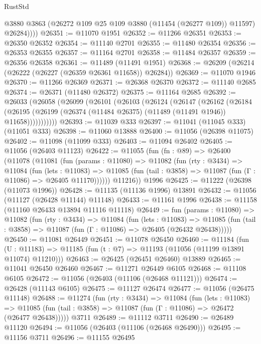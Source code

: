 \begin{lexlean}{RustStd}
\begin{coremodule}
            @3880
            @3863
            (@26272 @109 @25 @109 @3880 (@11454 (@26277 @109)) @11597)
            @26284))))
@26351 := @11070 @1951
@26352 := @11266 @26351
@26353 := @26350 @26352
@26354 := @11140 @2701
@26355 := @11480 @26354
@26356 := @26353 @26355
@26357 := @11164 @2701
@26358 := @11484 @26357
@26359 := @26356 @26358
@26361 := @11489 (@11491 @1951)
@26368 := @26209 (@26214 (@26222 (@26227 (@26359 @26361 @11658)) @26284))
@26369 := @11070 @1946
@26370 := @11266 @26369
@26371 := @26368 @26370
@26372 := @11140 @2685
@26374 := @26371 (@11480 @26372)
@26375 := @11164 @2685
@26392 := @26033
    (@26058
      (@26099
        (@26101
          (@26103
            (@26124
              (@26147
                (@26162
                  (@26184
                    (@26195
                      (@26199 (@26374 (@11484 @26375) (@11489 (@11491 @1946)) @11658)))))))))))
@26393 := @11039 @333
@26397 := @11041 (@11045 @333) (@11051 @333)
@26398 := @11060 @13888
@26400 := @11056 (@26398 @11075)
@26402 := @11098 (@11099 @333)
@26403 := @11094 @26402
@26405 := @11056 (@26403 @11123)
@26422 := @11055
    (fun (fn : @89) =>
    @26400
      (@11078
        (@11081
          (fun (params : @11080) =>
          @11082
            (fun (rty : @3434) =>
            @11084
              (fun (lets : @11083) =>
              @11085 (fun (tail : @3858) => @11087 (fun (Γ : @11086) => @26405 @11170))))))
        @11216))
    @1996
@26425 := @11222 (@26398 (@11073 @1996))
@26428 := @11135 (@11136 @1996) @13891
@26432 := @11056 (@11127 (@26428 @11144) @11148)
@26433 := @11161 @1996
@26438 := @11158 (@11160 @26433 @13894 @11116 @11118)
@26449 := fun (params : @11080) =>
  @11082
    (fun (rty : @3434) =>
    @11084
      (fun (lets : @11083) =>
      @11085 (fun (tail : @3858) => @11087 (fun (Γ : @11086) => @26405 (@26432 @26438)))))
@26450 := @11081 @26449
@26451 := @11078 @26450
@26460 := @11184
    (fun (U : @11183) => @11185 (fun (t : @7) => @11193 (@11056 (@11199 @13891 @11074) @11210)))
@26463 := @26425 (@26451 @26460) @13889
@26465 := @11041 @26450 @26460
@26467 := @11271 @26449 @6105
@26468 := @11108 @6105
@26472 := @11056 (@26403 (@11106 (@26468 @11121)))
@26474 := @26428 (@11143 @6105)
@26475 := @11127 @26474
@26477 := @11056 (@26475 @11148)
@26488 := @11274
    (fun (rty : @3434) =>
    @11084
      (fun (lets : @11083) =>
      @11085 (fun (tail : @3858) => @11087 (fun (Γ : @11086) => @26472 (@26477 @26438)))))
    @3711
@26489 := @11112 @3711
@26490 := @26489 @11120
@26494 := @11056 (@26403 (@11106 (@26468 @26490)))
@26495 := @11156 @3711
@26496 := @11155 @26495

\end{coremodule}
\end{lexlean}

